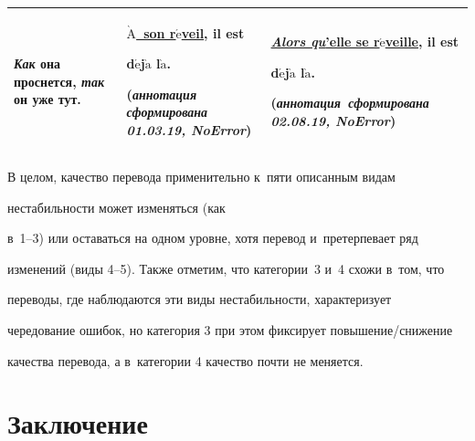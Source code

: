 \begin{enumerate}[1.]
\begin{center}
{\tabcolsep=5pt\begin{tabular}{|p{60pt}|p{125pt}|p{135pt}|}


\hline


\textit{Как} она проснется, \textit{так} он уже тут.


&\underline{$\grave{\mbox{A}}$~son r$\acute{\mbox{e}}$veil}, il est 


d$\acute{\mbox{e}}$j$\grave{\mbox{a}}$ l$\grave{\mbox{a}}$.


(\textit{аннотация сформирована 01.03.19, NoError})


&\underline{\textit{Alors qu}'elle se r$\acute{\mbox{e}}$veille}, il est\newline 


d$\acute{\mbox{e}}$j$\grave{\mbox{a}}$ l$\grave{\mbox{a}}$. 


(\textit{ан\-но\-та\-ция~сформирована 02.08.19, NoError})\\


  \hline


  \end{tabular}}


  \end{center}


  


  \end{enumerate}


  


  В целом, качество перевода применительно к~пяти описанным видам 


нестабильности может изменяться (как 


  в~1--3) или оставаться на одном уровне, хотя перевод и~претерпевает ряд 


изменений (виды 4--5). Также отметим, что категории~3 и~4 схожи в~том, что 


переводы, где наблюдаются эти виды нестабильности, характеризует 


чередование ошибок, но категория 3 при этом фиксирует повышение/снижение 


качества перевода, а в~категории 4 качество почти не меняется.





\section{Заключение}






